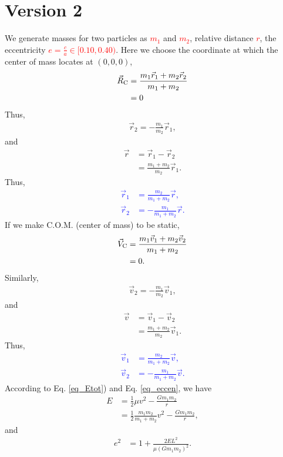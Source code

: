 \documentclass[a4paper,12pt]{article}
\begin{document}
\section{Version 2}
We generate masses for two particles as \textcolor{red}{$m_1$} and \textcolor{red}{$m_2$}, relative distance \textcolor{red}{$r$}, the eccentricity \textcolor{red}{$e=\frac{c}{a} \in [0.10,0.40)$}.
Here we choose the coordinate at which the center of mass locates at $(0,0,0)$,
\begin{align}
    \vec{R}_{\rm C}&=\frac{m_1 \vec{r}_1+ m_2 \vec{r}_2}{m_1+m_2}\\
    &=0
\end{align}
Thus,
\begin{align}
    \vec{r}_2=-\frac{m_1}{m_2}\vec{r}_1,
\end{align}
and 
\begin{align}
    \vec{r}&=\vec{r}_1-\vec{r}_2\\
    &=\frac{m_1+m_2}{m_2}\vec{r}_1.
\end{align}
Thus,
\textcolor{blue}{
\begin{align}
    \vec{r}_1&=\frac{m_2}{m_1+m_2}\vec{r},\\
    \vec{r}_2&=-\frac{m_1}{m_1+m_2}\vec{r}.
\end{align}
}
If we make C.O.M. (center of mass) to be static,
\begin{align}
    \vec{V}_{\rm C}&=\frac{m_1\vec{v}_1+m_2\vec{v}_2}{m_1+m_2}\\
    &=0.
\end{align}
Similarly,
\begin{align}
    \vec{v}_2=-\frac{m_1}{m_2}\vec{v}_1,
\end{align}
and
\begin{align}
    \vec{v}&=\vec{v}_1-\vec{v}_2\\
    &=\frac{m_1+m_2}{m_2}\vec{v}_1.
\end{align}
Thus,
\textcolor{blue}{
\begin{align}
    \vec{v}_1&=\frac{m_2}{m_1+m_2}\vec{v},\\
    \vec{v}_2&=-\frac{m_1}{m_1+m_2}\vec{v}.
\end{align}
}
According to Eq. \eqref{eq_Etot}) and Eq. \eqref{eq_eccen}, we have
\begin{align}
    E&=\frac{1}{2}\mu v^2-\frac{G m_1 m_2}{r}\\
    &=\frac{1}{2}\frac{m_1 m_2}{m_1+m_2}v^2-\frac{G m_1 m_2}{r},\label{eq_energyfinal}
\end{align}
and 
\begin{align}
    e^2&=1+\frac{2E L^2}{\mu(Gm_1 m_2)^2}.
\end{align}
\end{document}
